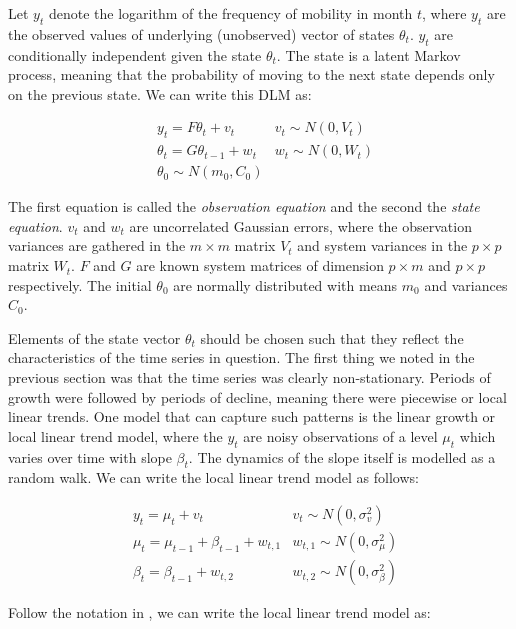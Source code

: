 \documentclass[12pt, a4paper]{article}
\begin{document}
Let $y_{t}$ denote the logarithm of the frequency of mobility in month
$t$, where $y_{t}$ are the observed values of underlying
(unobserved) vector of states $\theta_{t}$. $y_{t}$ are
conditionally independent given the state $\theta_{t}$. The state
is a latent Markov process, meaning that the probability of
moving to the next state depends only on the previous state. We can
write this DLM as:

\begin{align}
& y_{t} = F \theta_{t} + v_{t} & v_{t} \sim N(0, V_{t}) \\
& \theta_{t} = G \theta_{t-1} + w_{t} &w_{t} \sim N(0, W_{t}) \\
& \theta_{0} \sim N(m_{0}, C_{0})
\end{align}


The first equation is called the \emph{observation equation} and the
second the \emph{state equation}. $v_{t}$ and $w_{t}$ are
uncorrelated Gaussian errors, where the observation variances are
gathered in the $m \times m$ matrix $V_{t}$ and system variances in
the $p \times p$ matrix $W_{t}$. $F$ and $G$ are known system
matrices of dimension $p \times m$ and $p \times p$ respectively.
The initial $\theta_{0}$ are normally distributed with means $m_{0}$
and variances $C_{0}$.

Elements of the state vector $\theta_{t}$ should be
chosen such that they reflect the characteristics of the time series in
question. The first thing we noted in the previous section was that the
time series was clearly non-stationary. Periods of growth were followed by periods of decline, meaning there were piecewise or local linear trends. One model that can capture such patterns is the linear growth or local linear trend model, where the
$y_{t}$ are noisy observations of a level $\mu_{t}$ which varies
over time with slope $\beta_{t}$. The dynamics of the slope itself is
modelled as a random walk. We can write the local linear trend model as
follows:


\begin{align}
& y_{t} = \mu_{t} + v_{t} & v_{t} \sim N(0, \sigma_{v}^{2}) \\
& \mu_{t} = \mu_{t-1} + \beta_{t-1} + w_{t,1} &w_{t,1} \sim N(0, \sigma_{\mu}^{2}) \\
& \beta_{t} = \beta_{t-1} + w_{t,2} &w_{t,2} \sim N(0, \sigma_{\beta}^{2})
\end{align}


Follow the notation in \citet{petris2009dynamic}, we can write the local
linear trend model as:
\end{document}

